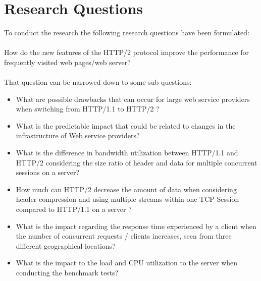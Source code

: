 \section{Research Questions}
\label{chap:rq}
To conduct the research the following research questions have been formulated: \\
\\
How do the new features of the  HTTP/2 protocol improve the performance for frequently visited web pages/web server? 
\\
\\
That question can be narrowed down to some sub questions:

\begin{itemize}
\item What are possible drawbacks that can occur for large web service providers when switching from HTTP/1.1 to HTTP/2 ?
\item What is the predictable impact that could be related to changes in the infrastructure of Web service providers?
\item What is the difference in bandwidth utilization between HTTP/1.1 and HTTP/2 considering the size ratio of header and data for multiple concurrent sessions on a server?
\item How much can HTTP/2 decrease the amount of data when considering header compression and using multiple streams within one TCP Session compared to HTTP/1.1 on a server ?
\item What is the impact regarding the response time experienced by a client when the number of concurrent requests / clients increases, seen from three different geographical locations?
\item What is the impact to the load and CPU utilization to the server when conducting the benchmark tests?
\end{itemize}